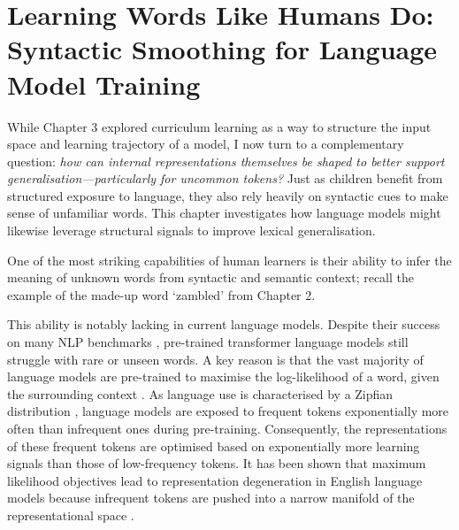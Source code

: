\chapter{Learning Words Like Humans Do: Syntactic Smoothing for Language Model Training}
\label{chapter:syntactic-smoothing}

While Chapter 3 explored curriculum learning as a way to structure the input space and learning trajectory of a model, I now turn to a complementary question: \emph{how can internal representations themselves be shaped to better support generalisation—particularly for uncommon tokens?} Just as children benefit from structured exposure to language, they also rely heavily on syntactic cues to make sense of unfamiliar words. This chapter investigates how language models might likewise leverage structural signals to improve lexical generalisation.

One of the most striking capabilities of human learners is their ability to infer the meaning of unknown words from syntactic and semantic context; recall the example of the made-up word `zambled' from Chapter 2.


This ability is notably lacking in current language models. Despite their success on many NLP benchmarks \citep{touvron2023llama, chowdhery2023palm}, pre-trained transformer language models still struggle with rare or unseen words. A key reason is that the vast majority of language models are pre-trained to maximise the log-likelihood of a word, given the surrounding context \citep{devlin2019bert, brown2020gpt3, chowdhery2023palm, touvron2023llama}. As language use is characterised by a Zipfian distribution \citep{zipf1935zipflaw}, language models are exposed to frequent tokens exponentially more often than infrequent ones during pre-training. Consequently, the representations of these frequent tokens are optimised based on exponentially more learning signals than those of low-frequency tokens. It has been shown that maximum likelihood objectives lead to representation degeneration in English language models because infrequent tokens are pushed into a narrow manifold of the representational space \citep{gao2018representation}. 

